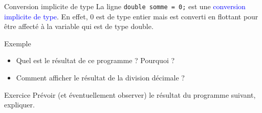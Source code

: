 \documentclass[10pt]{beamer}
\begin{document}
\begin{frame}[fragile]{\Ctitle}{\stitle}

	\begin{block}{Conversion implicite de type}
		La ligne \texttt{double somme = 0;} est une \textcolor{blue}{conversion implicite de type}. En effet, 0 est de type entier mais est converti en flottant pour être affecté à la variable  qui est de type double.
	\end{block}
\end{frame}

\begin{frame}[fragile]{\Ctitle}{\stitle}
	\begin{exampleblock}{Exemple}
		\begin{itemize}
			\item<2-> Quel est le résultat de ce programme ? Pourquoi ?
			\item<3-> Comment afficher le résultat de la division décimale ?
		\end{itemize}
	\end{exampleblock}
\end{frame}

\begin{frame}[fragile]{\Ctitle}{\stitle}
	\begin{exampleblock}{Exercice}
		Prévoir (et éventuellement observer) le résultat du programme suivant, expliquer.
	\end{exampleblock}
\end{frame}
\end{document}
